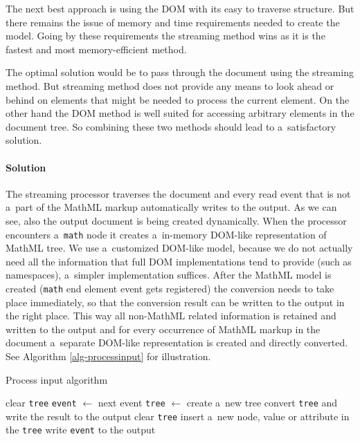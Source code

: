\documentclass[11pt,oneside,final]{fithesis2}
\begin{document}
The next best approach is using the DOM with its easy to traverse structure. But there remains the issue of memory and time requirements needed to create the model. Going by these requirements the streaming method wins as it is the fastest and most memory-efficient method.

The optimal solution would be to pass through the document using the streaming method. But streaming method does not provide any means to look ahead or behind on elements that might be needed to process the current element. On the other hand the DOM method is well suited for accessing arbitrary elements in the document tree. So combining these two methods should lead to a~satisfactory solution. 

\paragraph*{Solution}\label{inputprocessing:solution} The streaming processor traverses the document and every read event that is not a~part of the MathML markup automatically writes to the output. As we can see, also the output document is being created dynamically. When the processor encounters a~\texttt{math} node it creates a~in-memory DOM-like representation of MathML tree. We use a~customized DOM-like model, because we do not actually need all the information that full DOM implementations tend to provide (such as namespaces), a~simpler implementation suffices. After the MathML model is created (\texttt{math} end element event gets registered) the conversion needs to take place immediately, so that the conversion result can be written to the output in the right place. This way all non-MathML related information is retained and written to the output and for every occurrence of MathML markup in the document a~separate DOM-like representation is created and directly converted. See Algorithm \ref{alg-processinput} for illustration. 
\fi

\begin{algorithm}[!ht]
\caption{Process input algorithm}
\label{alg-processinput}
\begin{algorithmic}[1]
	\State clear \texttt{tree}
		\State \texttt{event} $\gets$ next event
			\State \texttt{tree} $\gets$ create a~new tree
			\State convert \texttt{tree} and write the result to the output
			\State clear \texttt{tree}			
			\State insert a~new node, value or attribute in the \texttt{tree}
		\Else
			\State write \texttt{event} to the output
		\EndIf
	\EndWhile
\EndProcedure
\end{algorithmic}
\end{algorithm}
\end{document}
